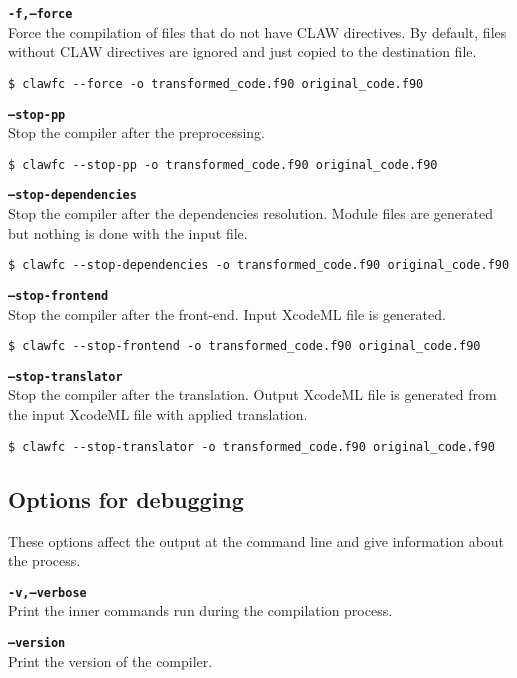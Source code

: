 \documentclass{article}
\begin{document}
\textbf{\texttt{-f,--force}}\\
Force the compilation of files that do not have CLAW directives. By default, files without CLAW directives are ignored and just copied to the destination file. 
\begin{lstlisting}
$ clawfc --force -o transformed_code.f90 original_code.f90
\end{lstlisting}

\textbf{\texttt{--stop-pp}}\\
Stop the compiler after the preprocessing.
\begin{lstlisting}
$ clawfc --stop-pp -o transformed_code.f90 original_code.f90
\end{lstlisting}

\textbf{\texttt{--stop-dependencies}}\\
Stop the compiler after the dependencies resolution. Module files are generated but nothing is done with the input file. 
\begin{lstlisting}
$ clawfc --stop-dependencies -o transformed_code.f90 original_code.f90
\end{lstlisting}

\textbf{\texttt{--stop-frontend}}\\
Stop the compiler after the front-end. Input XcodeML file is generated. 
\begin{lstlisting}
$ clawfc --stop-frontend -o transformed_code.f90 original_code.f90
\end{lstlisting}

\textbf{\texttt{--stop-translator}}\\
Stop the compiler after the translation. Output XcodeML file is generated from the input XcodeML file with applied translation. 
\begin{lstlisting}
$ clawfc --stop-translator -o transformed_code.f90 original_code.f90
\end{lstlisting}

\subsection{Options for debugging}
These options affect the output at the command line and give information about the process. 

\textbf{\texttt{-v,--verbose}}\\
Print the inner commands run during the compilation process. 

\textbf{\texttt{--version}}\\
Print the version of the compiler. 
\end{document}
